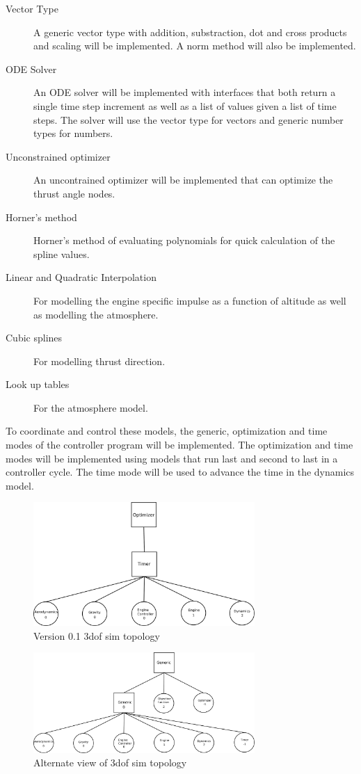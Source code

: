 \documentclass{book}
\begin{document}
\begin{description}
	\item[Vector Type] A generic vector type with addition, substraction, dot and cross products and scaling will be implemented. A norm method will also be implemented.
	\item[ODE Solver] An ODE solver will be implemented with interfaces that both return a single time step increment as well as a list of values given a list of time steps. The solver will use the vector type for vectors and generic number types for numbers.
	\item[Unconstrained optimizer] An uncontrained optimizer will be implemented that can optimize the thrust angle nodes.
	\item[Horner's method] Horner's method of evaluating polynomials for quick calculation of the spline values.
	\item[Linear and Quadratic Interpolation] For modelling the engine specific impulse as a function of altitude as well as modelling the atmosphere.
	\item[Cubic splines] For modelling thrust direction.
	\item[Look up tables] For the atmosphere model. 
\end{description}
To coordinate and control these models, the generic, optimization and time modes of the controller program will be implemented. The optimization and time modes will be implemented using models that run last and second to last in a controller cycle. The time mode will be used to advance the time in the dynamics model.

\begin{figure}[h]
\centering
\leavevmode
\includegraphics[width=0.75\textwidth]{01layout.pdf}
\caption{Version 0.1 3dof sim topology}
\label{01layout}
\end{figure}

\begin{figure}[h]
\begin{center}
\leavevmode
\includegraphics[width=0.75\textwidth]{01layoutalt.pdf}
\end{center}
\caption{Alternate view of 3dof sim topology}
\label{01layout_alt}
\end{figure}
\end{document}
